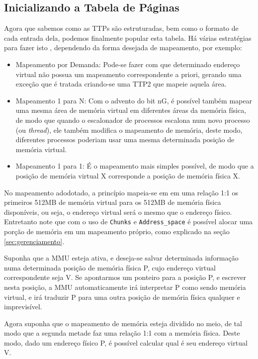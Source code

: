 \subsection{Inicializando a Tabela de Páginas}
\label{init_pages}
Agora que sabemos como as TTPs são estruturadas, bem como o formato de cada entrada dela, podemos finalmente popular esta tabela. Há várias estratégias para fazer isto \cite{mmutheory}, dependendo da forma desejada de mapeamento, por exemplo:

\begin{itemize}
	\item Mapeamento por Demanda: Pode-se fazer com que determinado endereço virtual não possua um mapeamento correspondente a priori, gerando uma exceção que é tratada criando-se uma TTP2 que mapeie aquela área.
	\item Mapeamento 1 para N: Com o advento do bit nG, é possível também mapear uma mesma área de memória virtual em diferentes áreas da memória física, de modo que quando o escalonador de processos escalona num novo processo (ou \emph{thread}), ele também modifica o mapeamento de memória, deste modo, diferentes processos poderiam usar uma mesma determinada posição de memória virtual.
	\item Mapeamento 1 para 1: É o mapeamento mais simples possível, de modo que a posição de memória virtual X corresponde a posição de memória física X.
\end{itemize}


No mapeamento adodotado, a princípio mapeia-se em em uma relação 1:1 os primeiros 512MB de memória virtual para os 512MB de memória física disponíveis, ou seja, o endereço virtual será o mesmo que o endereço físico. Entretanto note que com o uso de \verb+Chunks+ e \verb+Address_space+ é possível alocar uma porção de memória em um mapeamento próprio, como explicado na seção \ref{sec:gerenciamento}.

Suponha que a MMU esteja ativa, e deseja-se salvar determinada informação numa determinada posição de memória física P, cujo endereço virtual correspondente seja V. Se apontarmos um ponteiro para a posição P, e escrever nesta posição, a MMU automaticamente irá interpretar P como sendo memória virtual, e irá traduzir P para uma outra posição de memória física qualquer e imprevisível.

Agora suponha que o mapeamento de memória esteja dividido no meio, de tal modo que a segunda metade faz uma relação 1:1 com a memória física. Deste modo, dado um endereço físico P, é possível calcular qual é seu endereço virtual V. 


